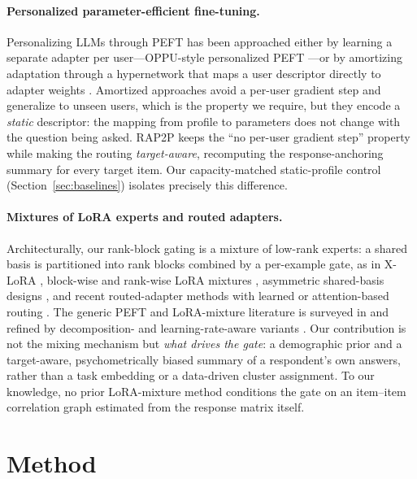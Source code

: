 \documentclass[letterpaper]{article} %
\begin{document}
\paragraph{Personalized parameter-efficient fine-tuning.}
Personalizing LLMs through PEFT has been approached either by learning a
separate adapter per user---OPPU-style personalized PEFT
\citep{tan2024democratizing}---or by amortizing adaptation through a
hypernetwork that maps a user descriptor directly to adapter weights
\citep{mllereberstein2024hypernetworks,gupta2026amortizing,otsuka2024userspecific}.
Amortized approaches avoid a per-user gradient step and generalize to unseen
users, which is the property we require, but they encode a \emph{static}
descriptor: the mapping from profile to parameters does not change with the
question being asked. RAP2P keeps the ``no per-user gradient step'' property
while making the routing \emph{target-aware}, recomputing the
response-anchoring summary for every target item. Our capacity-matched
static-profile control (Section~\ref{sec:baselines}) isolates precisely this
difference.

\paragraph{Mixtures of LoRA experts and routed adapters.}
Architecturally, our rank-block gating is a mixture of low-rank experts: a
shared basis is partitioned into rank blocks combined by a per-example gate,
as in X-LoRA \citep{buehler2024xlora}, block-wise and rank-wise LoRA mixtures
\citep{li2024blockwise,zou2025flylora}, asymmetric shared-basis designs
\citep{tian2024hydralora}, and recent routed-adapter methods with learned or
attention-based routing \citep{li2025loramixer,zhuang2025ldmole,ban2026rethinking}.
The generic PEFT and LoRA-mixture literature is surveyed in
\citet{han2024parameterefficient} and refined by decomposition- and
learning-rate-aware variants \citep{liu2024dora,lee2026learning}. Our
contribution is not the mixing mechanism but \emph{what drives the gate}: a
demographic prior and a target-aware, psychometrically biased summary of a
respondent's own answers, rather than a task embedding or a data-driven cluster
assignment. To our knowledge, no prior LoRA-mixture method conditions the gate
on an item--item correlation graph estimated from the response matrix itself.

\section{Method}
\label{sec:method}
\end{document}
